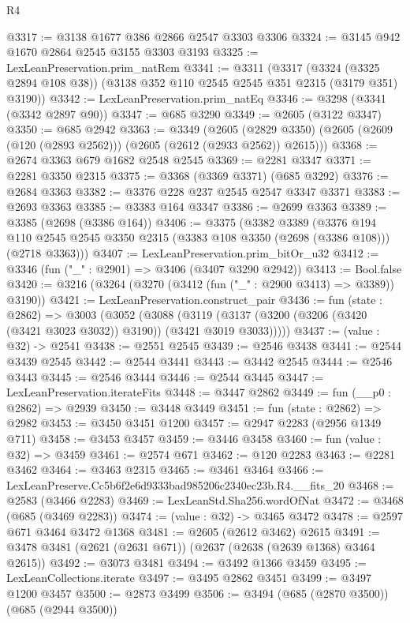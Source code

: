 \begin{lexlean}{R4}
\begin{coremodule}
@3317 := @3138 @1677 @386 @2866 @2547 @3303 @3306
@3324 := @3145 @942 @1670 @2864 @2545 @3155 @3303 @3193
@3325 := LexLeanPreservation.prim_natRem
@3341 := @3311
    (@3317
      (@3324 (@3325 @2894 @108 @38))
      (@3138 @352 @110 @2545 @2545 @351 @2315 (@3179 @351) @3190))
@3342 := LexLeanPreservation.prim_natEq
@3346 := @3298 (@3341 (@3342 @2897 @90))
@3347 := @685 @3290
@3349 := @2605 (@3122 @3347)
@3350 := @685 @2942
@3363 := @3349
    (@2605 (@2829 @3350) (@2605 (@2609 (@120 (@2893 @2562))) (@2605 (@2612 (@2933 @2562)) @2615)))
@3368 := @2674 @3363 @679 @1682 @2548 @2545
@3369 := @2281 @3347
@3371 := @2281 @3350 @2315
@3375 := @3368 (@3369 @3371) (@685 @3292)
@3376 := @2684 @3363
@3382 := @3376 @228 @237 @2545 @2547 @3347 @3371
@3383 := @2693 @3363
@3385 := @3383 @164 @3347
@3386 := @2699 @3363
@3389 := @3385 (@2698 (@3386 @164))
@3406 := @3375
    (@3382
      @3389
      (@3376
        @194
        @110
        @2545
        @2545
        @3350
        @2315
        (@3383 @108 @3350 (@2698 (@3386 @108)))
        (@2718 @3363)))
@3407 := LexLeanPreservation.prim_bitOr_u32
@3412 := @3346 (fun ("_" : @2901) => @3406 (@3407 @3290 @2942))
@3413 := Bool.false
@3420 := @3216 (@3264 (@3270 (@3412 (fun ("_" : @2900 @3413) => @3389)) @3190))
@3421 := LexLeanPreservation.construct_pair
@3436 := fun (state : @2862) =>
  @3003
    (@3052
      (@3088 (@3119 (@3137 (@3200 (@3206 (@3420 (@3421 @3023 @3032)) @3190)) (@3421 @3019 @3033)))))
@3437 := (value : @32) -> @2541
@3438 := @2551 @2545
@3439 := @2546 @3438
@3441 := @2544 @3439 @2545
@3442 := @2544 @3441
@3443 := @3442 @2545
@3444 := @2546 @3443
@3445 := @2546 @3444
@3446 := @2544 @3445
@3447 := LexLeanPreservation.iterateFits
@3448 := @3447 @2862
@3449 := fun (__p0 : @2862) => @2939
@3450 := @3448 @3449
@3451 := fun (state : @2862) => @2982
@3453 := @3450 @3451 @1200
@3457 := @2947 @2283 (@2956 @1349 @711)
@3458 := @3453 @3457
@3459 := @3446 @3458
@3460 := fun (value : @32) => @3459
@3461 := @2574 @671
@3462 := @120 @2283
@3463 := @2281 @3462
@3464 := @3463 @2315
@3465 := @3461 @3464
@3466 := LexLeanPreserve.Cc5b6f2e6d9333bad985206c2340ec23b.R4.__fits_20
@3468 := @2583 (@3466 @2283)
@3469 := LexLeanStd.Sha256.wordOfNat
@3472 := @3468 (@685 (@3469 @2283))
@3474 := (value : @32) -> @3465 @3472
@3478 := @2597 @671 @3464 @3472 @1368
@3481 := @2605 (@2612 @3462) @2615
@3491 := @3478 @3481 (@2621 (@2631 @671)) (@2637 (@2638 (@2639 @1368) @3464 @2615))
@3492 := @3073 @3481
@3494 := @3492 @1366 @3459
@3495 := LexLeanCollections.iterate
@3497 := @3495 @2862 @3451
@3499 := @3497 @1200 @3457
@3500 := @2873 @3499
@3506 := @3494 (@685 (@2870 @3500)) (@685 (@2944 @3500))

\end{coremodule}
\end{lexlean}
